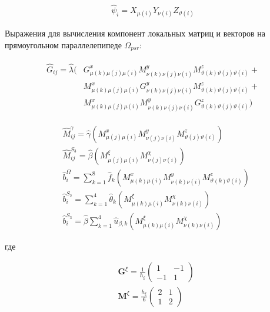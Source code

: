 \documentclass[12pt]{article}
\begin{document}
\begin{align}
  \label{eq:3} \hat{\psi}_i = X_{\mu(i)}Y_{\nu(i)}Z_{\vartheta(i)}
\end{align}

\vskip 5mm
\noindent Выражения для вычисления компонент локальных матриц и векторов на прямоугольном
параллелепипеде $\Omega_{psr}$:

\begin{align}
  \begin{split}
    \hat{G}_{ij} = \hat{\lambda}(
      &G^{x}_{\mu(k)\mu(j)\mu(i)}M^{y}_{\nu(k)\nu(j)\nu(i)}M^{z}_{\vartheta(k)\vartheta(j)\vartheta(i)} + \\
      &M^{x}_{\mu(k)\mu(j)\mu(i)}G^{y}_{\nu(k)\nu(j)\nu(i)}M^{z}_{\vartheta(k)\vartheta(j)\vartheta(i)} + \\
      &M^{x}_{\mu(k)\mu(j)\mu(i)}M^{y}_{\nu(k)\nu(j)\nu(i)}G^{z}_{\vartheta(k)\vartheta(j)\vartheta(i)}
    )
  \end{split}
\end{align}

\begin{align}
  &\hat{M}^{\gamma}_{ij} = \hat{\gamma}(
      M^{x}_{\mu(j)\mu(i)}M^{y}_{\nu(j)\nu(i)}M^{z}_{\vartheta(j)\vartheta(i)}
  ) \\
  &\hat{M}^{S_3}_{ij} = \hat{\beta}(
      M^{\xi}_{\mu(j)\mu(i)}M^{\chi}_{\nu(j)\nu(i)}
  ) \\
  &\hat{b}^{\Omega}_{i} = \sum_{k=1}^{8}\hat{f}_{k}(
      M^{x}_{\mu(k)\mu(i)}M^{y}_{\nu(k)\nu(i)}M^{z}_{\vartheta(k)\vartheta(i)}
  ) \\
  &\hat{b}^{S_2}_{i} = \sum_{k=1}^{4}\hat{\theta}_{k}(
      M^{\xi}_{\mu(k)\mu(i)}M^{\chi}_{\nu(k)\nu(i)}
  ) \\
  &\hat{b}^{S_3}_{i} = \hat{\beta}\sum_{k=1}^{4}\hat{u}_{\beta, k}(
      M^{\xi}_{\mu(k)\mu(i)}M^{\chi}_{\nu(k)\nu(i)}
  )
\end{align}

\vskip 5mm
\noindent где

\begin{align}
  &\textbf{G}^{\xi} = \frac{1}{h_{\xi}}
    \begin{pmatrix}
      1 & -1 \\
      -1 & 1
    \end{pmatrix} \\
  &\textbf{M}^{\xi} = \frac{h_{\xi}}{6}
    \begin{pmatrix}
      2 & 1 \\
      1 & 2
    \end{pmatrix}
\end{align}
\end{document}
